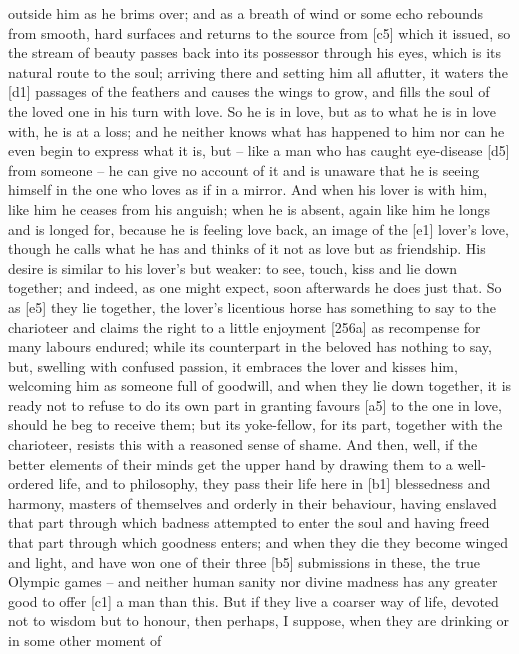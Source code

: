 outside him as he brims over; and as a breath of wind or some echo
rebounds from smooth, hard surfaces and returns to the source from
{[}c5{]} which it issued, so the stream of beauty passes back into its
possessor through his
eyes, which is its natural route to the soul; arriving there and setting
him all aflutter, it waters the {[}d1{]} passages of the feathers and
causes the wings to grow, and fills the soul of the loved one in his
turn with love. So he is in love, but as to what he is in love with, he
is at a loss; and he neither knows what has happened to him nor can he
even begin to express what it is, but -- like a man who has caught
eye-disease {[}d5{]} from someone -- he can give no account of it and is
unaware that he is seeing himself in the one who loves as if in a
mirror. And when his lover is with him, like him he ceases from his
anguish; when he is absent, again like him he longs and is longed for,
because he is feeling love back, an image of the {[}e1{]} lover's love,
though he calls what he has and thinks of it not as love but as
friendship. His desire
is similar to his lover's but weaker: to see, touch, kiss and lie down
together; and indeed, as one might expect, soon afterwards he does just
that. So as {[}e5{]} they lie together, the lover's licentious horse has
something to say to the charioteer and claims the right to a little
enjoyment {[}256a{]} as recompense for many labours endured; while its
counterpart in the beloved has nothing to say, but, swelling with
confused passion, it embraces the lover and kisses him, welcoming him as
someone full of goodwill, and when they lie down together, it is ready
not to refuse to do its own part in granting favours {[}a5{]} to the one
in love, should he beg to receive them; but its yoke-fellow, for its
part, together with the charioteer, resists this with a reasoned sense
of shame. And then, well, if the better elements of their minds get the
upper hand by drawing them to a well-ordered life, and to philosophy,
they pass their life here in {[}b1{]} blessedness and harmony, masters
of themselves and orderly in their behaviour, having enslaved that part
through which badness attempted to enter the soul and having freed that
part through which goodness enters; and when they die they become winged
and light, and have won one of their three {[}b5{]}
submissions in these,
the true Olympic games -- and neither human sanity nor divine madness
has any greater good to offer {[}c1{]} a man than this. But if they live
a coarser way of life, devoted not to wisdom but to honour, then
perhaps, I suppose, when they are drinking or in some other moment of

